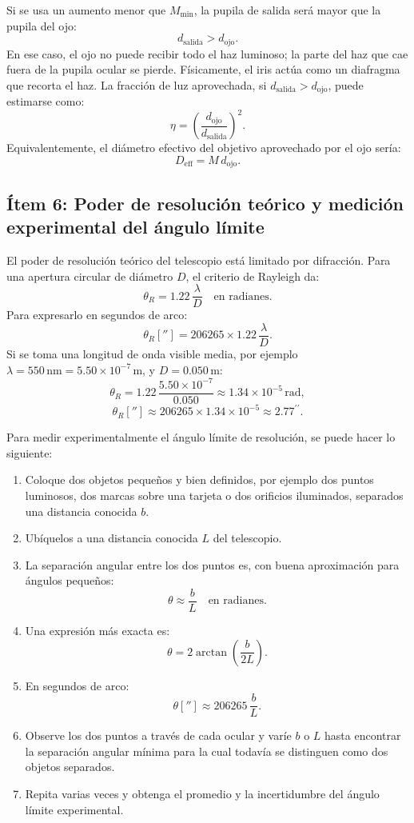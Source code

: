 Si se usa un aumento menor que $M_{\min}$, la pupila de salida será mayor que la pupila del ojo:
$$
d_{\mathrm{salida}}>d_{\mathrm{ojo}}.
$$
En ese caso, el ojo no puede recibir todo el haz luminoso; la parte del haz que cae fuera de la pupila ocular se pierde. Físicamente, el iris actúa como un diafragma que recorta el haz. La fracción de luz aprovechada, si $d_{\mathrm{salida}}>d_{\mathrm{ojo}}$, puede estimarse como:
$$
\eta=\left(\frac{d_{\mathrm{ojo}}}{d_{\mathrm{salida}}}\right)^2.
$$
Equivalentemente, el diámetro efectivo del objetivo aprovechado por el ojo sería:
$$
D_{\mathrm{eff}}=M\,d_{\mathrm{ojo}}.
$$



\subsection{Ítem 6: Poder de resolución teórico y medición experimental del ángulo límite}

El poder de resolución teórico del telescopio está limitado por difracción. Para una apertura circular de diámetro $D$, el criterio de Rayleigh da:
$$
\theta_R=1.22\,\frac{\lambda}{D}
\quad \text{en radianes}.
$$
Para expresarlo en segundos de arco:
$$
\theta_R['']=206265\times 1.22\,\frac{\lambda}{D}.
$$
Si se toma una longitud de onda visible media, por ejemplo $\lambda=550\,\mathrm{nm}=5.50\times10^{-7}\,\mathrm{m}$, y $D=0.050\,\mathrm{m}$:
$$
\theta_R
=
1.22\,\frac{5.50\times10^{-7}}{0.050}
\approx
1.34\times10^{-5}\,\mathrm{rad},
$$
$$
\theta_R['']
\approx
206265\times1.34\times10^{-5}
\approx
2.77^{\prime\prime}.
$$

Para medir experimentalmente el ángulo límite de resolución, se puede hacer lo siguiente:

\begin{enumerate}
    \item Coloque dos objetos pequeños y bien definidos, por ejemplo dos puntos luminosos, dos marcas sobre una tarjeta o dos orificios iluminados, separados una distancia conocida $b$.
    \item Ubíquelos a una distancia conocida $L$ del telescopio.
    \item La separación angular entre los dos puntos es, con buena aproximación para ángulos pequeños:
$$
\theta \approx \frac{b}{L}
\quad \text{en radianes}.
$$
    \item Una expresión más exacta es:
$$
\theta=2\arctan\left(\frac{b}{2L}\right).
$$
    \item En segundos de arco:
$$
\theta['']\approx 206265\,\frac{b}{L}.
$$
    \item Observe los dos puntos a través de cada ocular y varíe $b$ o $L$ hasta encontrar la separación angular mínima para la cual todavía se distinguen como dos objetos separados.
    \item Repita varias veces y obtenga el promedio y la incertidumbre del ángulo límite experimental.
\end{enumerate}

